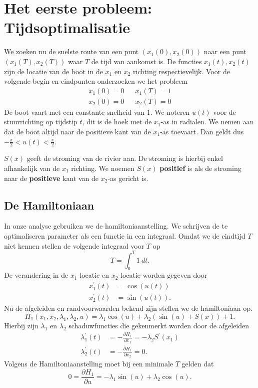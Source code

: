 \chapter{Het eerste probleem: Tijdsoptimalisatie}
We zoeken nu de snelste route van een punt \((x_1(0), x_2(0))\) naar een punt \((x_1(T), x_2(T))\) waar \(T\) de tijd van aankomst is. De functies \(x_1(t), x_2(t)\) zijn de locatie van de boot in de \(x_1\) en \(x_2\) richting respectievelijk. Voor de volgende begin en eindpunten onderzoeken we het probleem
\begin{align*}
	x_1(0) = 0 && x_1(T) = 1\\
	x_2(0) = 0 && x_2(T) = 0	
\end{align*}
De boot vaart met een constante snelheid van \(1\). We noteren \(u(t)\) voor de stuurrichting op tijdstip \(t\), dit is de hoek met de \(x_1\)-as in radialen. We nemen aan dat de boot altijd naar de positieve kant van de \(x_1\)-as toevaart. Dan geldt dus \(-\frac{\pi}{2} < u(t) < \frac{\pi}{2}\). 

\(S(x)\) geeft de stroming van de rivier aan. De stroming is hierbij enkel afhankelijk van de \(x_1\) richting. We noemen \(S(x)\) \textbf{positief} is als de stroming naar de \textbf{positieve} kant van de \(x_2\)-as gericht is.

\section{De Hamiltoniaan}\label{sec:Hamilton1}
In onze analyse gebruiken we de hamiltoniaanstelling. We schrijven de te optimaliseren parameter als een functie in een integraal. Omdat we de eindtijd \(T\) niet kennen stellen de volgende integraal voor \(T\) op
\begin{equation}
	T = \int_{0}^{T} 1~dt \label{eq:Tint}.
\end{equation}
De verandering in de \(x_1\)-locatie en \(x_2\)-locatie worden gegeven door
\begin{align}
	x_1^\prime(t) &= \cos (u(t))\label{eq:x1'}\\
	x_2^\prime(t) &= \sin (u(t))\label{eq:x2'}.
\end{align}
Nu de afgeleiden en randvoorwaarden bekend zijn stellen we de hamiltoniaan op.
\begin{equation}
	H_1(x_1, x_2, \lambda_1, \lambda_2, u) = \lambda_1 \cos(u) + \lambda_2 (\sin(u) + S(x)) + 1 \label{eq:Hamilton1}.
\end{equation}
Hierbij zijn \(\lambda_1\) en \(\lambda_2\) schaduwfuncties die gekenmerkt worden door de afgeleiden
\begin{align}
	\lambda_1^\prime(t) &= -\frac{\partial H_1}{\partial x_1} = -\lambda_2S^\prime(x_1) \label{eq:l1'}\\
	\lambda_2^\prime(t) &= -\frac{\partial H_1}{\partial x_2} = 0 \label{eq:l2'}.
\end{align}
Volgens de Hamiltoniaanstelling moet bij een minimale \(T\) gelden dat
\begin{equation}
	0 = \frac{\partial H_1}{\partial u} = -\lambda_1 \sin(u) + \lambda_2 \cos(u) \label{eq:dH/du_1}.
\end{equation}

